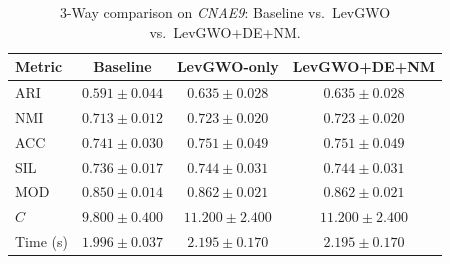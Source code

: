 \begin{table}[htbp]
\centering
\caption{3-Way comparison on \textit{CNAE9}: Baseline vs.\ LevGWO vs.\ LevGWO+DE+NM.}
\label{tab:cnae9_3way}
\begin{tabular}{lccc}
\toprule
Metric & Baseline & LevGWO-only & LevGWO+DE+NM \\
\midrule
ARI & $0.591 \pm 0.044$ & $\mathbf{0.635 \pm 0.028}$ & $\mathbf{0.635 \pm 0.028}$ \\
NMI & $0.713 \pm 0.012$ & $\mathbf{0.723 \pm 0.020}$ & $\mathbf{0.723 \pm 0.020}$ \\
ACC & $0.741 \pm 0.030$ & $\mathbf{0.751 \pm 0.049}$ & $\mathbf{0.751 \pm 0.049}$ \\
SIL & $0.736 \pm 0.017$ & $\mathbf{0.744 \pm 0.031}$ & $\mathbf{0.744 \pm 0.031}$ \\
MOD & $0.850 \pm 0.014$ & $\mathbf{0.862 \pm 0.021}$ & $\mathbf{0.862 \pm 0.021}$ \\
$C$ & $9.800 \pm 0.400$ & $11.200 \pm 2.400$ & $11.200 \pm 2.400$ \\
Time (s) & $1.996 \pm 0.037$ & $2.195 \pm 0.170$ & $2.195 \pm 0.170$ \\
\bottomrule
\end{tabular}
\end{table}